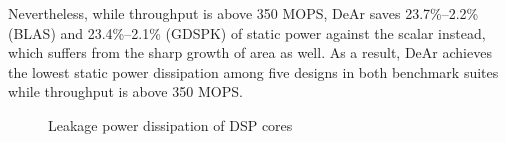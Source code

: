 {    Nevertheless, while throughput is above 350 MOPS, DeAr saves 23.7\%--2.2\% (BLAS) and 23.4\%--2.1\% (GDSPK) of static power against the scalar instead, 
    which suffers from the sharp growth of area as well.
    As a result, DeAr achieves the lowest static power dissipation among five designs in both benchmark suites while throughput is above 350 MOPS.
    \vspace{\textfig}
    \begin{figure}[!ht]
        \begin{center}
        \end{center}
        \caption{Leakage power dissipation of DSP cores}
        \label{chart:leakage}
    \end{figure}
}


